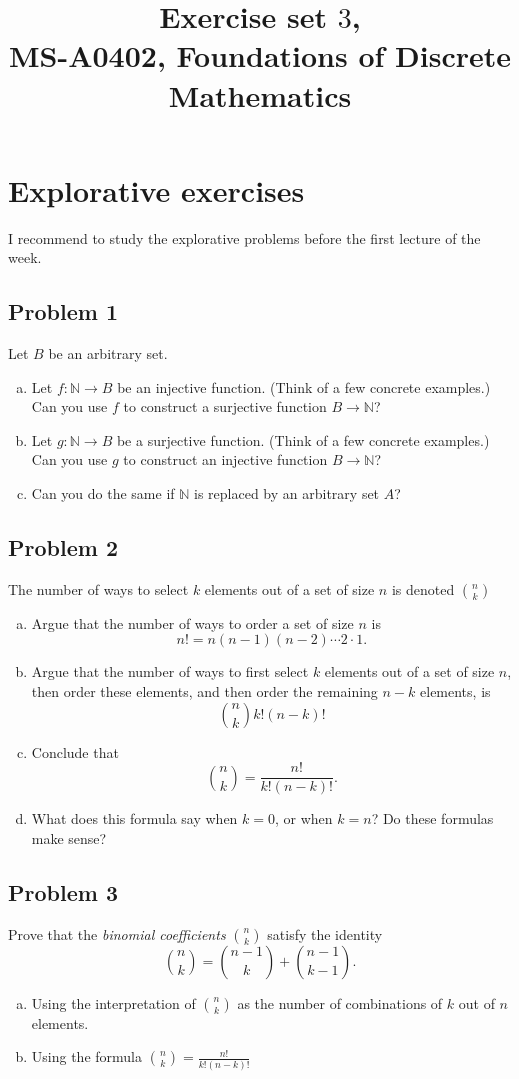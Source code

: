 \documentclass{amsart}
\title{Exercise set $3$, \\ MS-A0402, Foundations of Discrete Mathematics}
\newcommand{\N}{\mathbb{N}}
\theoremstyle{definition} \newtheorem*{definition}{Definition}
\theoremstyle{remark} \newtheorem*{ex}{Example}
\begin{document}
\hspace{-1cm}
\maketitle
 
\section*{Explorative exercises}
I recommend to study the explorative problems before the first lecture of the week.

\subsection*{Problem 1} Let $B$ be an arbitrary set.
 \begin{enumerate}[a)]\item Let $f:\N\to B$ be an injective function. (Think of a few concrete examples.) Can you use $f$ to construct a surjective function $B\to \N$?
\item Let $g:\N\to B$ be a surjective function. (Think of a few concrete examples.) Can you use $g$ to construct an injective function $B\to \N$?
\item Can you do the same if $\N$ is replaced by an arbitrary set $A$? 
\end{enumerate}

 \subsection*{Problem 2}
The number of ways to select $k$ elements out of a set of size $n$ is denoted $\binom{n}{k}$
\begin{enumerate}[a)]
\item Argue that the number of ways to order a set of size $n$ is $$n!=n(n-1)(n-2)\cdots 2\cdot 1.$$
\item Argue that the number of ways to first select $k$ elements out of a set of size $n$, then order these elements, and then order the remaining $n-k$ elements, is $$\binom{n}{k}k!(n-k)!$$
\item Conclude that $$\binom{n}{k}=\frac{n!}{k!(n-k)!}.$$
\item What does this formula say when $k=0$, or when $k=n$? Do these formulas make sense?
\end{enumerate}

\subsection*{Problem 3}
Prove that the {\em binomial coefficients} $\binom{n}{k}$ satisfy the identity $$\binom{n}{k}=\binom{n-1}{k}+\binom{n-1}{k-1}.$$
\begin{enumerate}[a)]
\item Using the interpretation of $\binom{n}{k}$ as the number of combinations of $k$ out of $n$ elements.
\item Using the formula $\binom{n}{k}=\frac{n!}{k!(n-k)!}$
\end{enumerate}
\end{document}
